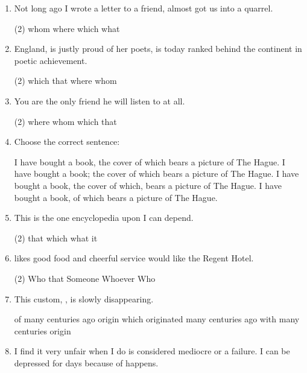\begin{enumerate}
\item Not long ago I wrote a letter to a friend, \ttu almost got us into a quarrel.
\begin{tasks}(2)
  \task whom
  \task where
  \task which
  \task what
\end{tasks}

\item England, \ttu is justly proud of her poets, is today ranked behind the
  continent in poetic achievement.
\begin{tasks}(2)
  \task which
  \task that
  \task where
  \task whom
\end{tasks}

\item You are the only friend \ttu he will listen to at all.
\begin{tasks}(2)
  \task where
  \task whom
  \task which
  \task that
\end{tasks}

\item Choose the correct sentence:
\begin{tasks}
  \task I have bought a book, the cover of which bears a picture of The Hague.
  \task I have bought a book; the cover of which bears a picture of The Hague.
  \task I have bought a book, the cover of which, bears a picture of The Hague.
  \task I have bought a book, of which bears a picture of The Hague.
\end{tasks}

\item This is the one encyclopedia upon \ttu I can depend.
\begin{tasks}(2)
  \task that
  \task which
  \task what
  \task it
\end{tasks}

\item \ttu likes good food and cheerful service would like the Regent Hotel.
\begin{tasks}(2)
  \task Who that
  \task Someone
  \task Whoever
  \task Who
\end{tasks}

\item This custom, \ttu, is slowly disappearing.
\begin{tasks}
  \task of many centuries ago origin
  \task which originated many centuries ago
  \task with many centuries origin
\end{tasks}

\item I find it very unfair when \ttu I do is considered mediocre or a
  failure. I can be depressed for days because of \ttu happens.


\end{enumerate}
